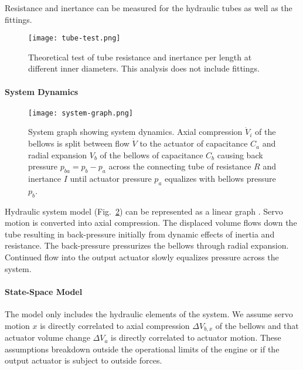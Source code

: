 Resistance and inertance can be measured for the hydraulic tubes as well
as the fittings.

\begin{figure}
\hypertarget{ch1:fig:tube-test}{%
\centering
\texttt{[image: tube-test.png]}
\caption{Theoretical test of tube resistance and inertance per length at
different inner diameters. This analysis does not include
fittings.}\label{ch1:fig:tube-test}
}
\end{figure}

\hypertarget{ch1:system-dynamics}{%
\paragraph{System Dynamics}\label{ch1:system-dynamics}}

\begin{figure}
\hypertarget{ch1:fig:system-graph}{%
\centering
\texttt{[image: system-graph.png]}
\caption{System graph showing system dynamics. Axial compression
\(\dot{V}_i\) of the bellows is split between flow \(\dot{V}\) to the
actuator of capacitance \(C_a\) and radial expansion \(V_b\) of the
bellows of capacitance \(C_b\) causing back pressure
\(p_{ba} = p_b-p_a\) across the connecting tube of resistance \(R\) and
inertance \(I\) until actuator pressure \(p_a\) equalizes with bellows
pressure \(p_b\).}\label{ch1:fig:system-graph}
}
\end{figure}

Hydraulic system model (Fig.~\ref{ch1:fig:system-graph}) can be represented 
as a linear graph \cite{shearer1967introduction}. 
Servo motion is converted into axial compression. 
The displaced volume flows down the tube resulting in back-pressure
initially from dynamic effects of inertia and resistance. 
The back-pressure pressurizes the bellows through radial expansion.
Continued flow into the output actuator slowly equalizes pressure across the system.

\hypertarget{ch1:state-space-model}{%
\paragraph{State-Space Model}\label{ch1:state-space-model}}

The model only includes the hydraulic elements of the system. We assume
servo motion \(x\) is directly correlated to axial compression
\(\Delta V_{b,x}\) of the bellows and that actuator volume change
\(\Delta V_a\) is directly correlated to actuator motion. These
assumptions breakdown outside the operational limits of the engine or if
the output actuator is subject to outside forces.

